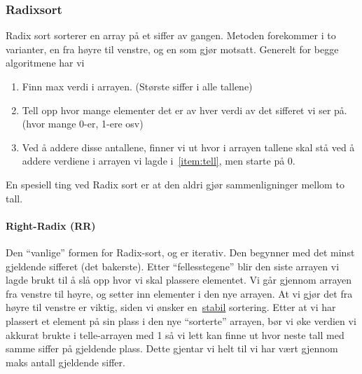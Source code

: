 \subsubsection{Radixsort}\label{radixsort}
Radix sort sorterer en array på et siffer av gangen.
Metoden forekommer i to varianter, en fra høyre til venstre, og en som gjør
motsatt. Generelt for begge algoritmene har vi
\begin{enumerate}
\item Finn max verdi i arrayen. (Største siffer i alle tallene)
\item\label{item:tell} Tell opp hvor mange elementer det er av hver verdi av det sifferet vi ser
  på. (hvor mange 0-er, 1-ere osv)
\item Ved å addere disse antallene, finner vi ut hvor i arrayen tallene skal stå
  ved å addere verdiene i arrayen vi lagde i~\ref{item:tell}, men starte på 0.
\end{enumerate}
En spesiell ting ved Radix sort er at den aldri gjør sammenligninger mellom to
tall.

\paragraph{Right-Radix (RR)}
Den ``vanlige'' formen for Radix-sort, og er iterativ.
Den begynner med det minst gjeldende sifferet (det bakerste). Etter
``fellesstegene'' blir den siste arrayen vi lagde brukt til å slå opp hvor vi
skal plassere elementet. Vi går gjennom arrayen fra venstre til høyre, og setter
inn elementer i den nye arrayen. At vi gjør det fra høyre til venstre er viktig,
siden vi ønsker en~\hyperref[stabil]{stabil} sortering. Etter at vi har plassert
et element på sin plass i den nye ``sorterte'' arrayen, bør vi øke verdien vi
akkurat brukte i telle-arrayen med 1 så vi lett kan finne ut hvor neste tall med
samme siffer på gjeldende plass. Dette gjentar vi helt til vi har vært gjennom
maks antall gjeldende siffer.

